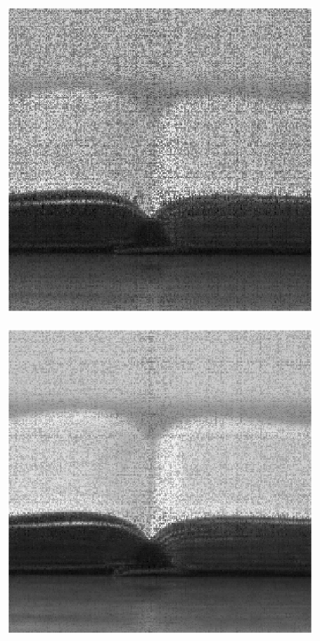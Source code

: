 \begin{figure}
    \begin{subfigure}{0.325\linewidth}
        \includegraphics[width=\linewidth]{Poglavja/Slike/preprosta grayscale 300/rez35SVT.png}
    \end{subfigure}
    \hfill
    \begin{subfigure}{0.325\linewidth}
        \includegraphics[width=\linewidth]{Poglavja/Slike/preprosta grayscale 300/rez45SVT.png}

\end{subfigure}
\end{figure}
